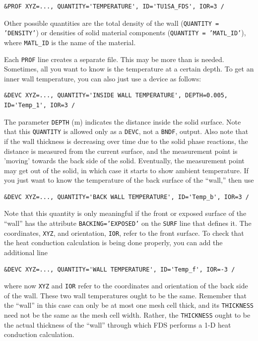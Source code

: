 \documentclass[11pt]{book}
\newcommand{\ct}{\tt\small}
\begin{document}
\footnotesize
\begin{verbatim}
&PROF XYZ=..., QUANTITY='TEMPERATURE', ID='TU1SA_FDS', IOR=3 /
\end{verbatim} \normalsize

\noindent
Other possible quantities are the total density of the wall ({\ct QUANTITY = 'DENSITY'}) or densities of
solid material components ({\ct QUANTITY = 'MATL\_ID'}), where {\ct MATL\_ID} is the name of the
material.

Each {\ct PROF} line creates a separate file. This may be more than is
needed. Sometimes, all you want to know is the temperature at a
certain depth. To get an inner wall temperature, you can also just use
a device as follows:

\footnotesize
\begin{verbatim}
&DEVC XYZ=..., QUANTITY='INSIDE WALL TEMPERATURE', DEPTH=0.005, ID='Temp_1', IOR=3 /
\end{verbatim} \normalsize

\noindent
The parameter {\ct DEPTH} (m) indicates the distance inside the solid surface.
Note that this {\ct QUANTITY} is allowed only as a {\ct DEVC}, not a
{\ct BNDF}, output. Also note that if the wall thickness is decreasing
over time due to the solid phase reactions, the distance is
measured from the current surface, and the measurement point is
'moving' towards the back side of the solid. Eventually, the
measurement point may get out of the solid, in which case it starts to
show ambient temperature. If you just want to know the temperature of the back surface
of the ``wall,'' then use

\footnotesize
\begin{verbatim}
&DEVC XYZ=..., QUANTITY='BACK WALL TEMPERATURE', ID='Temp_b', IOR=3 /
\end{verbatim} \normalsize

\noindent
Note that this quantity is only meaningful if the front or exposed surface of the ``wall'' has
the attribute {\ct BACKING='EXPOSED'} on the {\ct SURF} line that defines it. The coordinates, {\ct XYZ}, and orientation, {\ct IOR}, refer to
the front surface. To check that the heat conduction calculation is being done properly, you can add the additional line

\footnotesize
\begin{verbatim}
&DEVC XYZ=..., QUANTITY='WALL TEMPERATURE', ID='Temp_f', IOR=-3 /
\end{verbatim} \normalsize

\noindent
where now {\ct XYZ} and {\ct IOR} refer to the coordinates and orientation of the back side of the wall. These two wall temperatures ought to be
the same. Remember that the ``wall'' in this case can only be at most one mesh cell thick, and its {\ct THICKNESS} need not be the same as the
mesh cell width. Rather, the {\ct THICKNESS} ought to be the actual thickness of the ``wall'' through which FDS performs a 1-D heat conduction
calculation.
\end{document}
